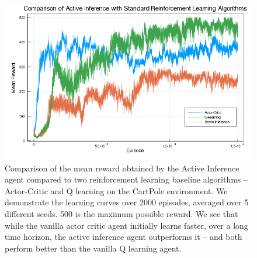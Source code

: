 \begin{figure}[H]
    \centering
    \includegraphics[scale=0.4]{chapter_4_figures/basic_comparison_graph.png}
    \caption{Comparison of the mean reward obtained by the Active Inference agent compared to two reinforcement learning baseline algorithms -- Actor-Critic and Q learning on the CartPole environment. We demonstrate the learning curves over 2000 episodes, averaged over 5 different seeds. 500 is the maximum possible reward. We see that while the vanilla actor critic agent initially learns faster, over a long time horizon, the active inference agent outperforms it -- and both perform better than the vanilla Q learning agent.}
    \label{CartPole Comparison}
\end{figure}

